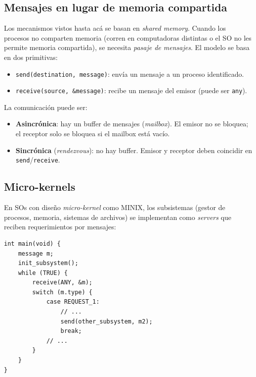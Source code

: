 \documentclass[11pt,a4paper]{article}
\begin{document}
\subsection{Mensajes en lugar de memoria compartida}

Los mecanismos vistos hasta acá se basan en \emph{shared memory}.
Cuando los procesos no comparten memoria (corren en computadoras
distintas o el SO no les permite memoria compartida), se necesita
\emph{pasaje de mensajes}. El modelo se basa en dos primitivas:

\begin{itemize}[leftmargin=*,nosep]
    \item \texttt{send(destination, message)}: envía un mensaje a un
        proceso identificado.
    \item \texttt{receive(source, \&message)}: recibe un mensaje del
        emisor (puede ser \texttt{any}).
\end{itemize}

La comunicación puede ser:

\begin{itemize}[leftmargin=*,nosep]
    \item \textbf{Asincrónica}: hay un buffer de mensajes
        (\emph{mailbox}). El emisor no se bloquea; el receptor solo
        se bloquea si el mailbox está vacío.
    \item \textbf{Sincrónica} (\emph{rendezvous}): no hay buffer.
        Emisor y receptor deben coincidir en \texttt{send}/\texttt{receive}.
\end{itemize}

\subsection{Micro-kernels}

En SOs con diseño \emph{micro-kernel} como MINIX, los subsistemas
(gestor de procesos, memoria, sistemas de archivos) se implementan
como \emph{servers} que reciben requerimientos por mensajes:

\begin{lstlisting}[style=cstyle]
int main(void) {
    message m;
    init_subsystem();
    while (TRUE) {
        receive(ANY, &m);
        switch (m.type) {
            case REQUEST_1:
                // ...
                send(other_subsystem, m2);
                break;
            // ...
        }
    }
}
\end{lstlisting}

\end{document}
